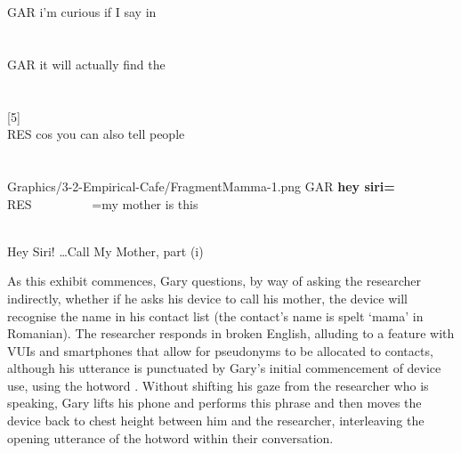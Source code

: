 \begin{revisedsubmission}
\begin{fragfloat*}
    {
    \begin{transcript*}
        \by GAR {i'm curious if I say in} \\
         \\
         \\
        \by GAR {it will actually find the } \\
         \\
         \\ %
        \later {\ldots}[5] \\
        \by RES {cos you can also tell people} \\
         \\
         \\
           {Graphics/3-2-Empirical-Cafe/FragmentMamma-1.png}
        \by GAR {\textbf{hey siri=}} \\
        \by RES {~~~~~~~~~=my mother is this} \\
         \\ \vspace{3.9cm}
    \end{transcript*}
    \nopagebreak[4]
    \caption{Hey Siri! \ldots Call My Mother, part (i)}\label{frag:empirical cafe findings capability-i}
    }
\end{fragfloat*}

As this exhibit commences, Gary questions, by way of asking the researcher indirectly, whether if he asks his device to call his mother, the device will recognise the name in his contact list (the contact's name is spelt `mama' in Romanian).
The researcher responds in broken English, alluding to a feature with \acp{VUI} and smartphones that allow for pseudonyms to be allocated to contacts, although his utterance is punctuated by Gary's initial commencement of device use, using the hotword .
Without shifting his gaze from the researcher who is speaking, Gary lifts his phone and performs this phrase and then moves the device back to chest height between him and the researcher, interleaving the opening utterance of the hotword within their conversation.


\end{revisedsubmission}
